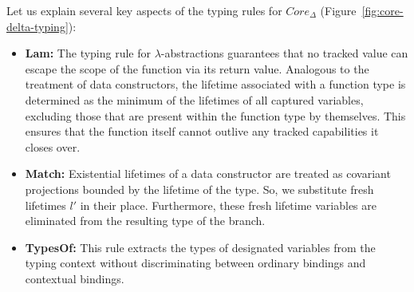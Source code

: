 \documentclass[11pt]{article}
\begin{document}
    Let us explain several key aspects of the typing rules for $Core_\Delta$ (Figure\ \ref{fig:core-delta-typing}):
    \begin{itemize}
        \item \textbf{Lam:} The typing rule for $\lambda$-abstractions guarantees that no tracked value can escape the scope of the function via its return value.
        Analogous to the treatment of data constructors, the lifetime associated with a function type is determined as the minimum of the lifetimes of all captured variables, excluding those that are present within the function type by themselves.
        This ensures that the function itself cannot outlive any tracked capabilities it closes over.
        \item \textbf{Match:}
        Existential lifetimes of a data constructor are treated as covariant projections bounded by the lifetime of the type. %
        So, we substitute fresh lifetimes $l'$ in their place.
        Furthermore, these fresh lifetime variables are eliminated from the resulting type of the branch.
        \item \textbf{TypesOf:} This rule extracts the types of designated variables from the typing context without discriminating between ordinary bindings and contextual bindings.
    \end{itemize}
\end{document}

